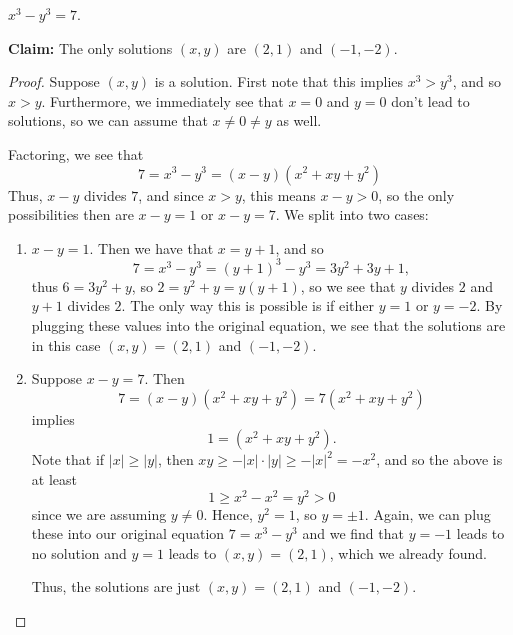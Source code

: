 \documentclass[11pt,dvipsnames]{book}
\numberwithin{equation}{section} %
\numberwithin{figure}{section} %
\numberwithin{table}{section} %
\begin{document}
\begin{exercise}
 $x^3-y^3=7$. 


\begin{solution}
{\bf Claim:} The only solutions $(x,y)$ are $(2,1)$ and $(-1,-2)$. 

\begin{proof}
Suppose $(x,y)$ is a solution. First note that this implies $x^3>y^3$, and so $x>y$. Furthermore, we immediately see that $x=0$ and $y=0$ don't lead to solutions, so we can assume that $x\neq 0 \neq y$ as well. 

Factoring, we see that 
\[
7 = x^3-y^3= (x-y)(x^2+xy+y^2)
\]
Thus, $x-y$ divides $ 7$, and since $x>y$, this means $x-y>0$, so the only possibilities then are $x-y=1$ or $x-y=7$. We split into two cases:

\begin{enumerate}[label=(\alph*)]
\item $x-y=1$. Then we have that $x=y+1$, and so
\[
7=x^3-y^3= (y+1)^3-y^3 = 3y^2+3y+1,\]
thus $6=3y^2+y$, so $2=y^2+y=y(y+1)$, so we see that $y$ divides $2$ and $y+1$ divides $2$. The only way this is possible is if either $y=1$ or $y=-2$. By plugging these values into the original equation, we see that the solutions are in this case $(x,y)=(2,1)$ and $(-1,-2)$.
\item Suppose $x-y=7$. Then
\[
7=(x-y)(x^2+xy+y^2)=7(x^2+xy+y^2)
\]
implies
\[
1=(x^2+xy+y^2).
\]
Note that if $|x|\geq |y|$, then $xy\geq -|x|\cdot |y|\geq -|x|^2=-x^2$, and so the above is at least
\[
1\geq x^2-x^2=y^2>0\]
since we are assuming $y\neq 0$. Hence, $y^2=1$, so $y=\pm 1$. Again, we can plug these into our original equation $7=x^3-y^3$ and we find that $y=-1$ leads to no solution and $y=1$ leads to $(x,y)=(2,1)$, which we already found.

Thus, the solutions are just $(x,y)=(2,1)$ and $(-1,-2)$.
\end{enumerate}


\end{proof}

\end{solution}
\end{exercise}
\end{document}
